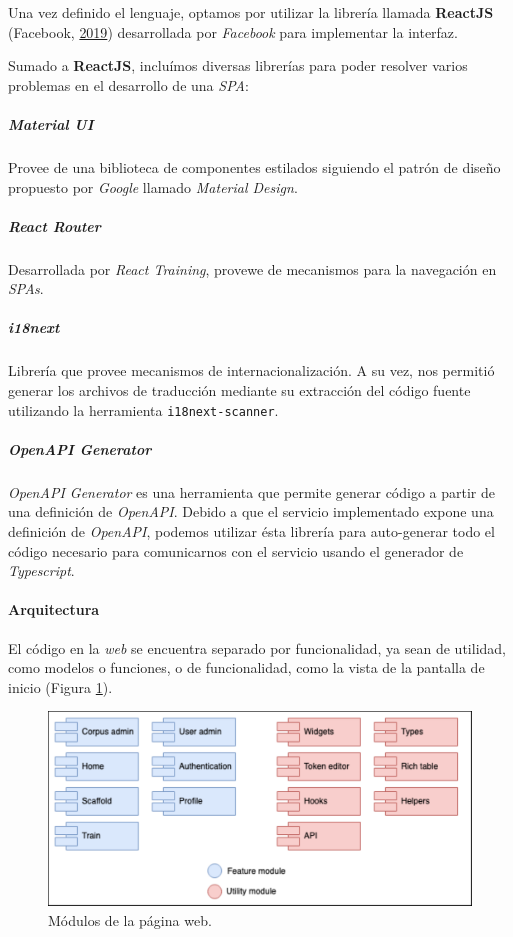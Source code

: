 \documentclass[12pt,a4paper,]{scrartcl}
\let\oldparagraph\paragraph
\renewcommand{\paragraph}[1]{\oldparagraph{#1}\mbox{}}
\let\oldsubparagraph\subparagraph
\renewcommand{\subparagraph}[1]{\oldsubparagraph{#1}\mbox{}}
\begin{document}
Una vez definido el lenguaje, optamos por utilizar la librería llamada \textbf{ReactJS} (Facebook, \protect\hyperlink{ref-react}{2019}) desarrollada por \emph{Facebook} para implementar la interfaz.

Sumado a \textbf{ReactJS}, incluímos diversas librerías para poder resolver varios problemas en el desarrollo de una \emph{SPA}:

\hypertarget{material-ui}{%
\subparagraph{Material UI}\label{material-ui}}

Provee de una biblioteca de componentes estilados siguiendo el patrón de diseño propuesto por \emph{Google} llamado \emph{Material Design}.

\hypertarget{react-router}{%
\subparagraph{React Router}\label{react-router}}

Desarrollada por \emph{React Training}, provewe de mecanismos para la navegación en \emph{SPAs}.

\hypertarget{i18next}{%
\subparagraph{i18next}\label{i18next}}

Librería que provee mecanismos de internacionalización. A su vez, nos permitió generar los archivos de traducción mediante su extracción del código fuente utilizando la herramienta \texttt{i18next-scanner}.

\hypertarget{openapi-generator}{%
\subparagraph{OpenAPI Generator}\label{openapi-generator}}

\emph{OpenAPI Generator} es una herramienta que permite generar código a partir de una definición de \emph{OpenAPI}.
Debido a que el servicio implementado expone una definición de \emph{OpenAPI}, podemos utilizar ésta librería para auto-generar todo el código necesario para comunicarnos con el servicio usando el generador de \emph{Typescript}.

\hypertarget{arquitectura}{%
\paragraph{Arquitectura}\label{arquitectura}}

El código en la \emph{web} se encuentra separado por funcionalidad, ya sean de utilidad, como modelos o funciones, o de funcionalidad, como la vista de la pantalla de inicio (Figura \ref{fig:developer-web-modules}).

\begin{figure}[H]

{\centering \includegraphics{assets/developer/web-modules.pdf} 

}

\caption{Módulos de la página web.}\label{fig:developer-web-modules}
\end{figure}
\end{document}
